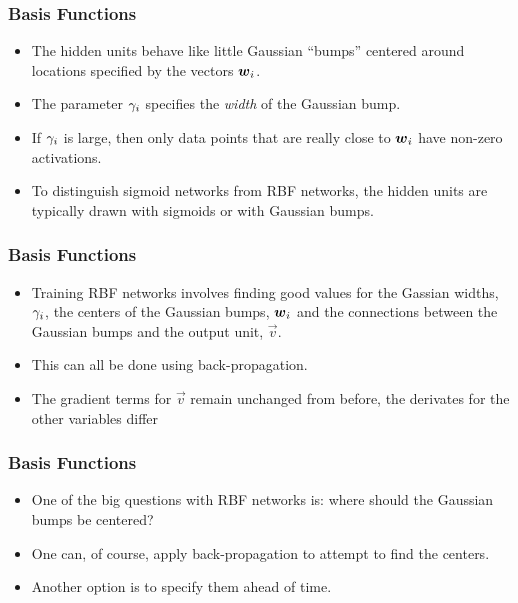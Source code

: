 \documentclass[trans]{beamer}
\begin{document}
\begin{frame}
  \frametitle{Basis Functions}
\begin{itemize}
\item
The hidden units behave like little Gaussian ``bumps''
centered around locations specified by the vectors ${\boldsymbol{w}}_i$.  
\item The parameter $\gamma_i$ specifies the \emph{width} of the Gaussian bump.
\item If $\gamma_i$ is large, then only data points that are really close to
${\boldsymbol{w}}_i$ have non-zero activations.  
\item To distinguish sigmoid networks
from RBF networks, the hidden units are typically drawn with sigmoids
or with Gaussian bumps.
\end{itemize}
\end{frame}


\begin{frame}
  \frametitle{Basis Functions}
\begin{itemize}
\item
Training RBF networks involves finding good values for the Gassian
widths, $\gamma_i$, the centers of the Gaussian bumps, ${\boldsymbol{w}}_i$ and the
connections between the Gaussian bumps and the output unit, $\vec v$.
\item This can all be done using back-propagation. 
\item The gradient terms for
$\vec v$ remain unchanged from before, the derivates for the other
variables differ 
\end{itemize}
\end{frame}

\begin{frame}
  \frametitle{Basis Functions}
\begin{itemize}
\item
One of the big questions with RBF networks is: where should the
Gaussian bumps be centered? 
\item  One can, of course, apply
back-propagation to attempt to find the centers. 
\item Another option is to
specify them ahead of time.
\end{itemize}
\end{frame}
\end{document}
